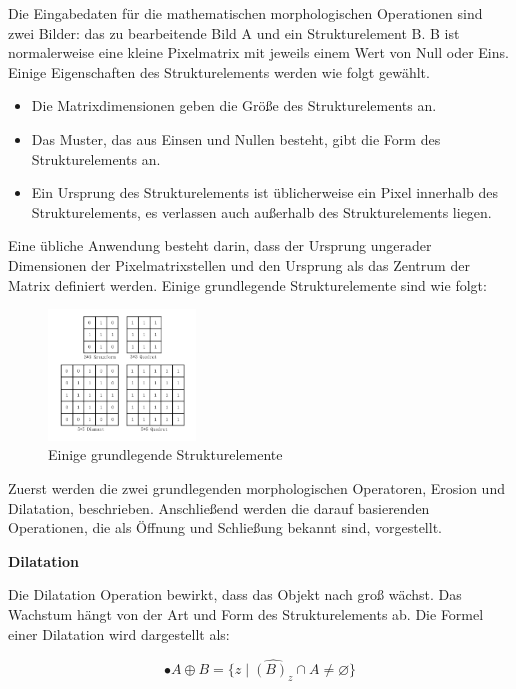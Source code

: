 Die Eingabedaten für die mathematischen morphologischen Operationen sind zwei Bilder: das zu bearbeitende Bild A und ein Strukturelement B. B ist normalerweise eine kleine Pixelmatrix mit jeweils einem Wert von Null oder Eins. Einige Eigenschaften des Strukturelements werden wie folgt gewählt.

\begin{itemize}
\item Die Matrixdimensionen geben die Größe des Strukturelements an.
\item Das Muster, das aus Einsen und Nullen besteht, gibt die Form des Strukturelements an.
\item Ein Ursprung des Strukturelements ist üblicherweise ein Pixel innerhalb des Strukturelements, es verlassen auch außerhalb des Strukturelements liegen. 
\end{itemize}

Eine übliche Anwendung besteht darin, dass der Ursprung ungerader Dimensionen der Pixelmatrixstellen und den Ursprung als das Zentrum der Matrix definiert werden. Einige grundlegende Strukturelemente sind wie folgt:

\begin{figure}[H]
 \centering 
  \includegraphics[keepaspectratio,width=0.35\textwidth]{images/4_ZweiteErfahrung/Morphological/strelement.pdf}
 \caption{Einige grundlegende Strukturelemente}
 \label{fig:Strukturelemente}
\end{figure} 

Zuerst werden die zwei grundlegenden morphologischen Operatoren, Erosion und Dilatation, beschrieben. Anschließend werden die darauf basierenden Operationen, die als Öffnung und Schließung bekannt sind, vorgestellt.

\textbf{Dilatation}

Die Dilatation Operation bewirkt, dass das Objekt nach groß wächst. Das Wachstum hängt von der Art und Form des Strukturelements ab. Die Formel einer Dilatation wird dargestellt als:

\begin{equation}
•A \oplus B =\lbrace z \mid \widehat{(B)_z} \cap A \ne \varnothing \rbrace  
\end{equation}

